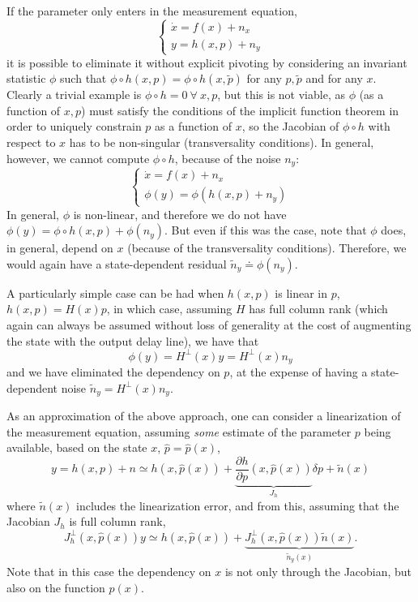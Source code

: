 \documentclass[]{article}
\newcommand{\bc}{\begin{cases}}
\newcommand{\ec}{\end{cases}}
\begin{document}
If the parameter only enters in the measurement equation, 
\begin{equation}
\bc
\dot x = f(x) +n_x \\
y = h(x,p) + n_y
\ec
\end{equation}
it is possible to eliminate it without explicit pivoting by considering an invariant statistic $\phi$ such that $\phi\circ h(x,p) = \phi \circ h(x,\tilde p)$ for any $p, \tilde p$ and for any $x$. Clearly a trivial example is $\phi\circ h = 0 \ \forall \ x, p$, but this is not viable, as $\phi$ (as a function of $x, p$) must satisfy the conditions of the implicit function theorem in order to uniquely constrain $p$ as a function of $x$, so the Jacobian of $\phi\circ h$ with respect to $x$ has to be non-singular (transversality conditions). In general, however, we cannot compute $\phi\circ h$, because of the noise $n_y$: 
\begin{equation}
\bc
\dot x = f(x) +n_x \\
\phi(y) = \phi(h(x,p) + n_y)
\ec
\end{equation}
In general, $\phi$ is non-linear, and therefore we do not have $\phi(y) = \phi\circ h(x,p) + \phi(n_y)$. But even if this was the case, note that $\phi$ does, in general, depend on $x$ (because of the transversality conditions). Therefore, we would again have a state-dependent residual $\tilde n_y \doteq \phi(n_y)$.

A particularly simple case can be had when $h(x,p)$ is linear in $p$, $h(x,p) = H(x)p$, in which case, assuming $H$ has full column rank (which again can always be assumed without loss of generality at the cost of augmenting the state with the output delay line), we have that 
\begin{equation}
\phi(y) = H^\perp(x) y = H^\perp(x) n_y
\end{equation}
and we have eliminated the dependency on $p$, at the expense of having a state-dependent noise $\tilde n_y = H^{\perp}(x) n_y$.

As an approximation of the above approach, one can consider a linearization of the measurement equation, assuming {\em some} estimate of the parameter $p$ being available, based on the state $x$, $\hat p = \hat p(x)$, 
\begin{equation}
y = h(x,p) + n \simeq h(x, \hat p(x)) + \underbrace{\frac{\partial h}{\partial p}(x,\hat p(x))}_{J_h} \delta p + \tilde n(x)
\end{equation}
where $\tilde n(x)$ includes the linearization error, and from this, assuming that the Jacobian $J_h$ is full column rank, 
\begin{equation}
J_h^\perp(x,\hat p(x)) y  \simeq h(x, \hat p(x)) +  \underbrace{J_h^\perp(x,\hat p(x)) \tilde n(x)}_{\tilde n_y(x)}.
\end{equation}
Note that in this case the dependency on $x$ is not only through the Jacobian, but also on the function $\hat p(x)$.

 
\end{document}
